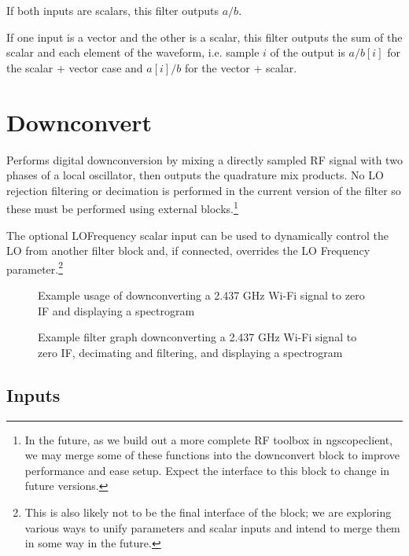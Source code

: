 If both inputs are scalars, this filter outputs $a / b$.

If one input is a vector and the other is a scalar, this filter outputs the sum  of the scalar and each element of the
waveform, i.e. sample $i$ of the output is $a / b[i]$ for the scalar + vector case and $a[i] / b$ for the vector +
scalar.

\pagebreak
\section{Downconvert}
\label{filter:downconvert}

Performs digital downconversion by mixing a directly sampled RF signal with two phases of a local oscillator, then
outputs the quadrature mix products. No LO rejection filtering or decimation is performed in the current version of the
filter so these must be performed using external blocks.\footnote{In the future, as we build out a more complete RF
toolbox in ngscopeclient, we may merge some of these functions into the downconvert block to improve performance and
ease setup. Expect the interface to this block to change in future versions.}

The optional LOFrequency scalar input can be used to dynamically control the LO from another filter block and, if
connected, overrides the LO Frequency parameter.\footnote{This is also likely not to be the final interface of the
block; we are exploring various ways to unify parameters and scalar inputs and intend to merge them in some way in
the future.}

\begin{figure}[h]
\centering
{}
\caption{Example usage of downconverting a 2.437 GHz Wi-Fi signal to zero IF and displaying a spectrogram}
\label{filter_downconvert}
\end{figure}

\begin{figure}[h]
\centering
{}
\caption{Example filter graph downconverting a 2.437 GHz Wi-Fi signal to zero IF, decimating and filtering, and
displaying a spectrogram}
\label{filter_graph_downconvert}
\end{figure}
\FloatBarrier
\subsection{Inputs}

